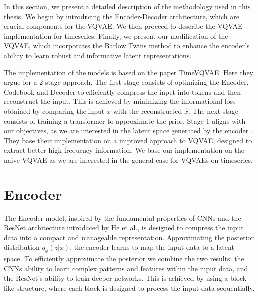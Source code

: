 
In this section, we present a detailed description of the methodology used in this thesis. We begin by introducing the Encoder-Decoder architecture, which are crucial components for the VQVAE. We then proceed to describe the VQVAE implementation for timeseries. Finally, we present our modification of the VQVAE, which incorporates the Barlow Twins method to enhance the encoder's ability to learn robust and informative latent representations.

The implementation of the models is based on the paper TimeVQVAE\cite{lee2023masked}. Here they argue for a 2 stage approach. The first stage consists of optimizing the Encoder, Codebook and Decoder to efficiently compress the input into tokens and then reconstruct the input.
This is achieved by minimizing the informational loss obtained by comparing the input $x$ with the reconstructed $\hat{x}$. The next stage consists of training a transformer to approximate the prior.
Stage 1 aligns with our objectives, as we are interested in the latent space generated by the encoder . They base their implementation on a improved approach to VQVAE, designed to extract better high frequency information. We base our implementation on the naive VQVAE as we are interested in the general case for VQVAEs on timeseries.


\section{Encoder}

The Encoder model, inspired by the fundamental properties of CNNs and the ResNet architecture introduced by He et al.\cite{ResLearn}, is designed to compress the input data into a compact and manageable representation.
Approximating the posterior distribution $q_\phi(z|x)$, the encoder learns to map the input data to a latent space. 
To efficiently approximate the posterior we combine the two results: the CNNs ability to learn complex patterns and features within the input data, and the ResNet's ability to train deeper networks. This is achieved by using a block like structure, where each block is designed to process the input data sequentially.

